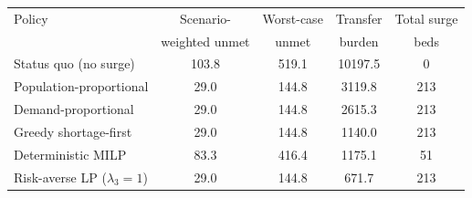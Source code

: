 ﻿\begin{tabular}{lcccc}
\toprule
Policy & Scenario- & Worst-case & Transfer & Total surge\\
       & weighted unmet & unmet & burden   & beds\\
\midrule
Status quo (no surge) & 103.8 & 519.1 & 10197.5 & 0 \\
Population-proportional & 29.0 & 144.8 & 3119.8 & 213 \\
Demand-proportional & 29.0 & 144.8 & 2615.3 & 213 \\
Greedy shortage-first & 29.0 & 144.8 & 1140.0 & 213 \\
Deterministic MILP & 83.3 & 416.4 & 1175.1 & 51 \\
Risk-averse LP ($\lambda_3{=}1$) & 29.0 & 144.8 & 671.7 & 213 \\
\bottomrule
\end{tabular}
